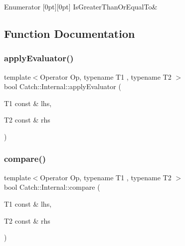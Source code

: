 \begin{DoxyEnumFields}{Enumerator}
[0pt][0pt]{}\mbox{\label{namespace_catch_1_1_internal_ae3f96598a7858155750bf38e7295d83ead2de7e9565e59e36c0987e402203ce1c}} 
Is\+Greater\+Than\+Or\+Equal\+To&\\
\hline

\end{DoxyEnumFields}


\subsection{Function Documentation}
\mbox{\label{namespace_catch_1_1_internal_a3849d993997f2b708281ff02e77dfecf}} 
\subsubsection{\texorpdfstring{apply\+Evaluator()}{applyEvaluator()}}
{\footnotesize\ttfamily template$<$Operator Op, typename T1 , typename T2 $>$ \\
bool Catch\+::\+Internal\+::apply\+Evaluator (\begin{DoxyParamCaption}\item[{T1 const \&}]{lhs,  }\item[{T2 const \&}]{rhs }\end{DoxyParamCaption})}

\mbox{\label{namespace_catch_1_1_internal_a64ae04769c4583b9d4027c792b496c7d}} 
\subsubsection{\texorpdfstring{compare()}{compare()}\hspace{0.1cm}{\footnotesize\ttfamily [1/17]}}
{\footnotesize\ttfamily template$<$Operator Op, typename T1 , typename T2 $>$ \\
bool Catch\+::\+Internal\+::compare (\begin{DoxyParamCaption}\item[{T1 const \&}]{lhs,  }\item[{T2 const \&}]{rhs }\end{DoxyParamCaption})}

